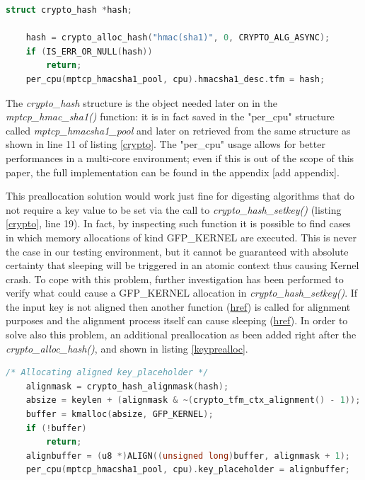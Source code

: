 \begin{lstlisting}[language=c, caption=\textit{\textit{Initializing the Crypto API framework}}, label=cryptoalloc]
	struct crypto_hash *hash;

	hash = crypto_alloc_hash("hmac(sha1)", 0, CRYPTO_ALG_ASYNC);
	if (IS_ERR_OR_NULL(hash))
		return;
	per_cpu(mptcp_hmacsha1_pool, cpu).hmacsha1_desc.tfm = hash;
\end{lstlisting}

The \textit{crypto\_hash} structure is the object needed later on in the \textit{mptcp\_hmac\_sha1()} function: it is in fact saved in the "per\_cpu" structure called \textit{mptcp\_hmacsha1\_pool} and later on retrieved from the same structure as shown in line 11 of listing \ref{crypto}. The "per\_cpu" usage allows for better performances in a multi-core environment; even if this is out of the scope of this paper, the full implementation can be found in the appendix [add appendix].


This preallocation solution would work just fine for digesting algorithms that do not require a key value to be set via the call to \textit{crypto\_hash\_setkey()} (listing \ref{crypto}, line 19). In fact, by inspecting such function it is possible to find cases in which memory allocations of kind GFP\_KERNEL are executed. This is never the case in our testing environment, but it cannot be guaranteed with absolute certainty that sleeping will be triggered in an atomic context thus causing Kernel crash. To cope with this problem, further investigation has been performed to verify what could cause a GFP\_KERNEL allocation in \textit{crypto\_hash\_setkey()}. If the input key is not aligned then another function (\href{http://lxr.free-electrons.com/source/crypto/shash.c#L61}{href}) is called for alignment purposes and the alignment process itself can cause sleeping (\href{http://lxr.free-electrons.com/source/crypto/shash.c#L43}{href}). In order to solve also this problem, an additional preallocation as been added right after the  \textit{crypto\_alloc\_hash()}, and shown in listing \ref{keyprealloc}.

\begin{lstlisting}[language=c, caption=\textit{\textit{Preallocating an aligned placeholder for the HMAC key}}, label=keyprealloc]
	/* Allocating aligned key_placeholder */
	alignmask = crypto_hash_alignmask(hash);
	absize = keylen + (alignmask & ~(crypto_tfm_ctx_alignment() - 1));
	buffer = kmalloc(absize, GFP_KERNEL);
	if (!buffer)
		return;
	alignbuffer = (u8 *)ALIGN((unsigned long)buffer, alignmask + 1);
	per_cpu(mptcp_hmacsha1_pool, cpu).key_placeholder = alignbuffer;
\end{lstlisting}

